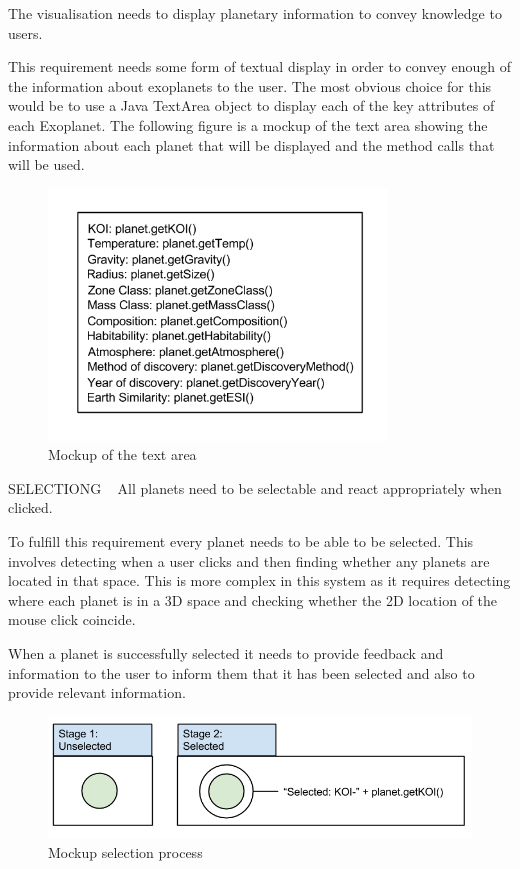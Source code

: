 \begin{enumerate}
{\bf
 \item[R1.] The visualisation needs to display planetary information to convey
knowledge to users.
}

  This requirement needs some form of textual display in order to convey enough
of the information about exoplanets to the user. The most obvious choice for
this would be to use a Java TextArea object to display each of the key
attributes of each Exoplanet. The following figure is a mockup of the text area
showing the information about each planet that will be displayed and the method
calls that will be used.

\begin{figure}[h!]
  \centering
      \includegraphics[width=0.8\textwidth]{images/textAreaMockup.png}
  \caption{Mockup of the text area}  
\end{figure}

SELECTIONG ~
All planets need to be selectable and react appropriately when
clicked.

To fulfill this requirement every planet needs to be able to be selected. This
involves detecting when a user clicks and then finding whether any planets are
located in that space. This is more complex in this system as it requires
detecting where each planet is in a 3D space and checking whether the 2D
location of the mouse click coincide. 

When a planet is successfully selected it needs to provide feedback and
information to the user to inform them that it has been selected and also to
provide relevant information.

\begin{figure}[h!]
  \centering
      \includegraphics[width=.8\textwidth]{images/mockSelected.png}
  \caption{Mockup selection process}  
\end{figure}


\end{enumerate}
